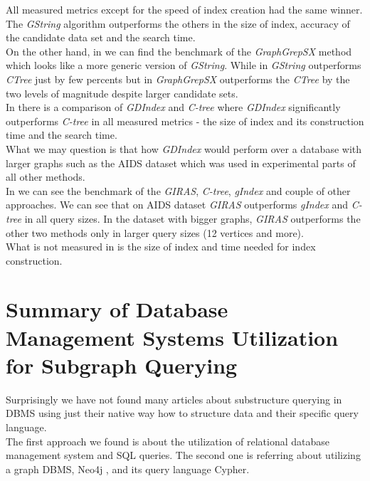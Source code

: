 All measured metrics except for the speed of index creation had the same winner. The \textit{GString} algorithm outperforms the others in the size of index, accuracy of the candidate data set and the search time.\\

On the other hand, in \cite{GraphGrepSX} we can find the benchmark of the \textit{GraphGrepSX} method which looks like a more generic version of \textit{GString}. While in \cite{GString} \textit{GString} outperforms \textit{CTree} just by few percents but in \cite{GraphGrepSX}  \textit{GraphGrepSX} outperforms the \textit{CTree} by the two levels of magnitude despite larger candidate sets.\\

In \cite{GDIndex} there is a comparison of \textit{GDIndex} and \textit{C-tree} where \textit{GDIndex} significantly outperforms \textit{C-tree} in all measured metrics - the size of index and its construction time and the search time.\\

What we may question is that how \textit{GDIndex} would perform over a database with larger graphs such as the AIDS dataset which was used in experimental parts of all other methods.\\

In \cite{GIRAS} we can see the benchmark of the \textit{GIRAS}, \textit{C-tree}, \textit{gIndex} and couple of other approaches. We can see that on AIDS dataset \textit{GIRAS} outperforms \textit{gIndex} and \textit{C-tree} in all query sizes. In the dataset with bigger graphs, \textit{GIRAS} outperforms the other two methods only in larger query sizes (12 vertices and more).\\

What is not measured in \cite{GIRAS} is the size of index and time needed for index construction.

\section{Summary of Database Management Systems Utilization for Subgraph Querying}

Surprisingly we have not found many articles about substructure querying in DBMS using just their native way how to structure data and their specific query language.\\

The first approach \cite{SQL} we found is about the utilization of relational database management system and SQL queries. The second one \cite{Hoksza} is referring about utilizing a graph DBMS, Neo4j \cite{Neo4J}, and its query language Cypher.

